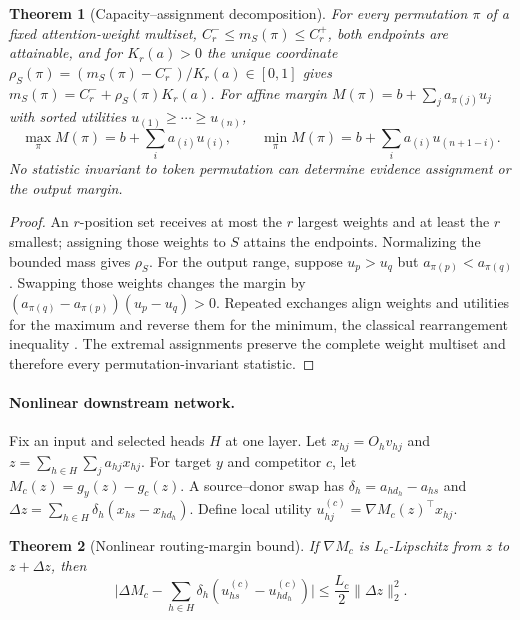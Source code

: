 \documentclass{article}
\newtheorem{theorem}{Theorem}
\begin{document}
\begin{theorem}[Capacity--assignment decomposition]
For every permutation $\pi$ of a fixed attention-weight multiset, $C_r^-\le m_S(\pi)\le C_r^+$, both endpoints
are attainable, and for $K_r(a)>0$ the unique coordinate $\rho_S(\pi)=(m_S(\pi)-C_r^-)/K_r(a)\in[0,1]$ gives
$m_S(\pi)=C_r^-+\rho_S(\pi)K_r(a)$. For affine margin $M(\pi)=b+\sum_j a_{\pi(j)}u_j$ with sorted utilities
$u_{(1)}\ge\cdots\ge u_{(n)}$,
\begin{equation}
\max_\pi M(\pi)=b+\sum_i a_{(i)}u_{(i)},\qquad \min_\pi M(\pi)=b+\sum_i a_{(i)}u_{(n+1-i)}.
\end{equation}
No statistic invariant to token permutation can determine evidence assignment or the output margin.
\label{thm:capacity}
\end{theorem}

\begin{proof}
An $r$-position set receives at most the $r$ largest weights and at least the $r$ smallest; assigning those
weights to $S$ attains the endpoints. Normalizing the bounded mass gives $\rho_S$. For the output range,
suppose $u_p>u_q$ but $a_{\pi(p)}<a_{\pi(q)}$. Swapping those weights changes the margin by
$(a_{\pi(q)}-a_{\pi(p)})(u_p-u_q)>0$. Repeated exchanges align weights and utilities for the maximum and
reverse them for the minimum, the classical rearrangement inequality \citep{hardylittlewoodpolya1952}. The
extremal assignments preserve the complete weight multiset and therefore every permutation-invariant statistic.
\end{proof}

\paragraph{Nonlinear downstream network.}
Fix an input and selected heads $H$ at one layer. Let $x_{hj}=O_h v_{hj}$ and
$z=\sum_{h\in H}\sum_j a_{hj}x_{hj}$. For target $y$ and competitor $c$, let $M_c(z)=g_y(z)-g_c(z)$. A
source--donor swap has $\delta_h=a_{hd_h}-a_{hs}$ and $\Delta z=\sum_{h\in H}\delta_h(x_{hs}-x_{hd_h})$.
Define local utility $u_{hj}^{(c)}=\nabla M_c(z)^\top x_{hj}$.

\begin{theorem}[Nonlinear routing-margin bound]
If $\nabla M_c$ is $L_c$-Lipschitz from $z$ to $z+\Delta z$, then
\begin{equation}
\Big|\Delta M_c-\sum_{h\in H}\delta_h(u_{hs}^{(c)}-u_{hd_h}^{(c)})\Big|\le\frac{L_c}{2}\lVert\Delta z\rVert_2^2.
\label{eq:app-nonlinear}
\end{equation}
\label{thm:nonlinear}
\end{theorem}
\end{document}
